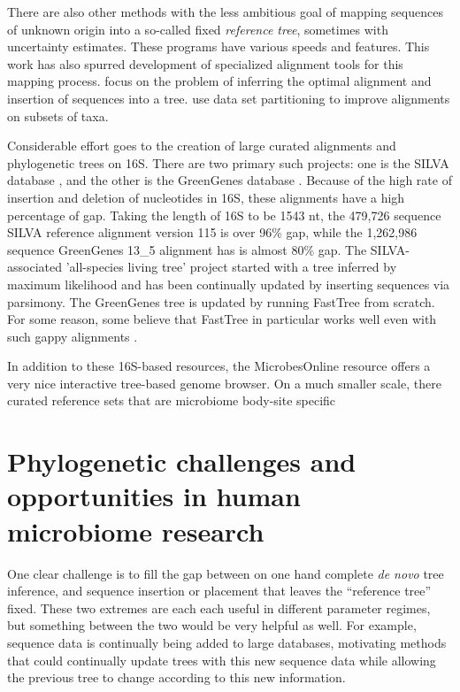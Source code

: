 \documentclass{amsart}
\begin{document}
There are also other methods with the less ambitious goal of mapping sequences of unknown origin into a so-called fixed \textit{reference tree}, sometimes with uncertainty estimates.
These programs \citep{wu2008simple,monierEaLargeViruses08,vonMeringEaQuantitative08,stark2010mltreemap,matsen2010pplacer,berger2011performance} have various speeds and features.
This work has also spurred development of specialized alignment tools for this mapping process.
\citet{berger2011aligning} focus on the problem of inferring the optimal alignment and insertion of sequences into a tree.
\citet{mirarabsepp} use data set partitioning to improve alignments on subsets of taxa.

Considerable effort goes to the creation of large curated alignments and phylogenetic trees on 16S.
There are two primary such projects: one is the SILVA database \citep{pruesse2007silva,quast2013silva}, and the other is the GreenGenes database \citep{desantis2006greengenes,mcdonald2011improved}.
Because of the high rate of insertion and deletion of nucleotides in 16S, these alignments have a high percentage of gap.
Taking the length of 16S to be 1543 nt,
the 479,726 sequence SILVA reference alignment version 115 is over 96\% gap,
while the 1,262,986 sequence GreenGenes 13\_5 alignment has is almost 80\% gap.
The SILVA-associated 'all-species living tree' project \citep{yarza2008all} started with a tree inferred by maximum likelihood and has been continually updated  by inserting sequences via parsimony.
The GreenGenes tree is updated by running FastTree from scratch.
For some reason, some believe that FastTree in particular works well even with such gappy alignments \citep[e.g.][]{sharpton2011phylotu}.

In addition to these 16S-based resources, the MicrobesOnline resource \citep{dehal2010microbesonline} offers a very nice interactive tree-based genome browser.
On a much smaller scale, there curated reference sets that are microbiome body-site specific \citep{chen2010human,griffen2011core,srinivasan2012bacterial}



\section{Phylogenetic challenges and opportunities in human microbiome research}

One clear challenge is to fill the gap between on one hand complete \emph{de novo} tree inference, and sequence insertion or placement that leaves the ``reference tree'' fixed.
These two extremes are each each useful in different parameter regimes, but something between the two would be very helpful as well.
For example, sequence data is continually being added to large databases, motivating methods that could continually update trees with this new sequence data while allowing the previous tree to change according to this new information.
\end{document}
